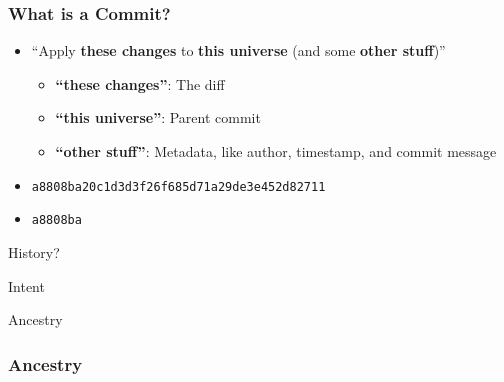 \documentclass{beamer}
\begin{document}
\begin{frame}
  \frametitle{What is a Commit?}

  \begin{itemize}
    \pause
  \item ``Apply \textbf{these changes} to \textbf{this universe} (and some \textbf{other stuff})''
    \begin{itemize}
      \pause
    \item \textbf{``these changes''}: The diff
      \pause
    \item \textbf{``this universe''}: Parent commit
      \pause
    \item \textbf{``other stuff''}: Metadata, like author, timestamp, and commit message
    \end{itemize}
    \pause
  \item \texttt{a8808ba20c1d3d3f26f685d71a29de3e452d82711}
    \pause
  \item \texttt{a8808ba}
  \end{itemize}
\end{frame}

\begin{frame}
  \begin{center}
    {\Huge History?}
  \end{center}
\end{frame}

\begin{frame}
  \begin{center}
    {\Huge Intent}
  \end{center}
\end{frame}

\begin{frame}
  \begin{center}
    {\Huge Ancestry}
  \end{center}
\end{frame}

\begin{frame}
  \frametitle{Ancestry}
  \begin{center}
  \end{center}
\end{frame}
\end{document}
